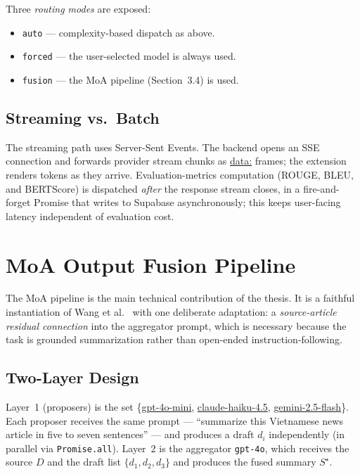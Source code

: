 Three \textit{routing modes} are exposed:

\begin{itemize}
  \item \texttt{auto} --- complexity-based dispatch as above.
  \item \texttt{forced} --- the user-selected model is always used.
  \item \texttt{fusion} --- the MoA pipeline (Section~3.4) is used.
\end{itemize}

\subsection{Streaming vs.\ Batch}

The streaming path uses Server-Sent Events. The backend opens an SSE
connection and forwards provider stream chunks as \url{data:} frames;
the extension renders tokens as they arrive.
Evaluation-metrics computation (ROUGE, BLEU, and BERTScore) is dispatched
\textit{after} the response stream closes, in a fire-and-forget Promise
that writes to Supabase asynchronously; this keeps user-facing latency
independent of evaluation cost.

\section{MoA Output Fusion Pipeline}

The MoA pipeline is the main technical contribution of the thesis. It is
a faithful instantiation of Wang et al.\ \cite{Wang2024} with one
deliberate adaptation: a \textit{source-article residual connection}
into the aggregator prompt, which is necessary because the task is
grounded summarization rather than open-ended instruction-following.

\subsection{Two-Layer Design}

Layer~1 (proposers) is the set \{\url{gpt-4o-mini},
\url{claude-haiku-4.5}, \url{gemini-2.5-flash}\}. Each proposer
receives the same prompt --- ``summarize this Vietnamese news article in
five to seven sentences'' --- and produces a draft $d_i$ independently
(in parallel via \texttt{Promise.all}). Layer~2 is the aggregator
\texttt{gpt-4o}, which receives the source $D$ and the draft list
$\{d_1, d_2, d_3\}$ and produces the fused summary $S^{\star}$.

